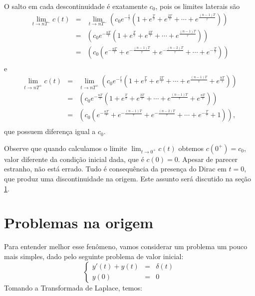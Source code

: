 O salto em cada descontinuidade é exatamente $c_0$, pois os limites laterais são
\begin{eqnarray*}
\lim_{t\to nT^-}c(t)&=&\lim_{t\to nT^-}\left(c_0e^{-\frac{t}{\tau}}\left(1+e^{\frac{T}{\tau}}+e^{\frac{2T}{\tau}}+\cdots+ e^{\frac{(n-1)T}{\tau}}\right)\right)\\
&=&\left(c_0e^{-\frac{nT}{\tau}}\left(1+e^{\frac{T}{\tau}}+e^{\frac{2T}{\tau}}+\cdots+ e^{\frac{(n-1)T}{\tau}}\right)\right)\\
&=&\left(c_0\left(e^{-\frac{nT}{\tau}}+e^{-\frac{(n-1)T}{\tau}}+e^{-\frac{(n-2)T}{\tau}}+\cdots+ e^{-\frac{T}{\tau}}\right)\right)\\
\end{eqnarray*}
e
\begin{eqnarray*}
\lim_{t\to nT^+}c(t)&=&\lim_{t\to nT^+}\left(c_0e^{-\frac{t}{\tau}}\left(1+e^{\frac{T}{\tau}}+e^{\frac{2T}{\tau}}+\cdots+ e^{\frac{(n-1)T}{\tau}}+ e^{\frac{nT}{\tau}}\right)\right)\\
&=&\left(c_0e^{-\frac{nT}{\tau}}\left(1+e^{\frac{T}{\tau}}+e^{\frac{2T}{\tau}}+\cdots+ e^{\frac{(n-1)T}{\tau}}+ e^{\frac{nT}{\tau}}\right)\right)\\
&=&\left(c_0\left(e^{-\frac{nT}{\tau}}+e^{-\frac{(n-1)T}{\tau}}+e^{-\frac{(n-2)T}{\tau}}+\cdots+ e^{-\frac{T}{\tau}}+1\right)\right),\\
\end{eqnarray*}
que possuem diferença igual a $c_0$. 

Observe que quando calculamos o limite $\displaystyle \lim_{t\to 0^+}c(t)$ obtemos $c(0^+)=c_0$, valor diferente da condição inicial dada, que é $c(0)=0$. Apesar de parecer estranho, não está errado. Tudo é consequência da presença do Dirac em $t=0$, que produz uma discontinuidade na origem. Este assunto será discutido na seção \ref{problemas_na_origem}.

\section{Problemas na origem}\label{problemas_na_origem}
Para entender melhor esse fenômeno, vamos considerar um problema um pouco mais simples, dado pelo seguinte problema de valor inicial:
\begin{equation*}
\left\{
\begin{array}{rcl}
y'(t)+y(t)&=&\delta(t)\\
y(0)&=&0
\end{array}
\right.
\end{equation*}
Tomando a Transformada de Laplace, temos:

